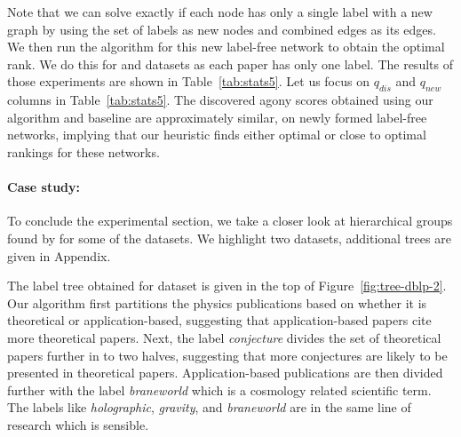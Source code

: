 
Note that we can solve \prblagy exactly
if each node has only a single label with a new graph
by using the set of labels
as new nodes and  combined edges as its edges.
We then run the \algexact algorithm for this new label-free network to obtain
the optimal rank.
We do this 
for  and 
datasets as each paper has only one label. 
The results of those experiments are shown in Table~\ref{tab:stats5}.
Let us focus on  $q_{dis}$ and $q_{new}$ columns in Table~\ref{tab:stats5}. The
discovered agony scores obtained using our algorithm and baseline are
approximately similar, on newly formed label-free networks, implying that our
heuristic finds either optimal or close to optimal rankings for these networks.
 



\paragraph{Case study:}

To conclude the experimental section, we take a closer look at  hierarchical groups found by  \algpartition  for some of the datasets. 
We highlight two datasets, additional trees are given in Appendix.

The label tree obtained for  dataset is given in the top of Figure~\ref{fig:tree-dblp-2}. Our algorithm  first partitions the physics publications based on whether it is theoretical  or application-based, suggesting that application-based papers cite more theoretical papers. Next, the label \emph{conjecture} divides the set of theoretical papers further in to two halves, suggesting that  more conjectures are likely to be presented in theoretical papers. Application-based publications are then divided further with the label \emph{braneworld} which is a cosmology related scientific term. The labels like \emph{holographic}, \emph{gravity}, and \emph{braneworld} are in the same line of research  which is sensible. 




